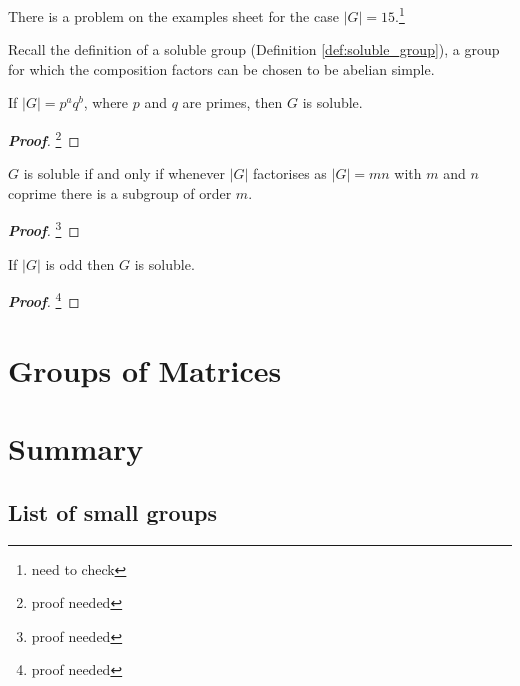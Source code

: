 \begin{example}
There is a problem on the examples sheet for the case $|G| = 15$.\footnote{need to check}
\end{example}

Recall the definition of a soluble group (Definition \ref{def:soluble_group}), a group for which the composition factors can be chosen to be abelian simple.

\begin{theorem}[1904, Burnside]
If $|G| = p^aq^b$, where $p$ and $q$ are primes, then $G$ is soluble.
\end{theorem}

\begin{proof}[\bf Proof]
\footnote{proof needed}
\end{proof}

\begin{theorem}[1937, Hall]
$G$ is soluble if and only if whenever $|G|$ factorises as $|G| = mn$ with $m$ and $n$ coprime there is a subgroup of order $m$.
\end{theorem}

\begin{proof}[\bf Proof]
\footnote{proof needed}
\end{proof}

\begin{theorem}
If $|G|$ is odd then $G$ is soluble.
\end{theorem}

\begin{proof}[\bf Proof]
\footnote{proof needed}
\end{proof}


\section{Groups of Matrices}


\section{Summary}

\subsection{List of small groups}

